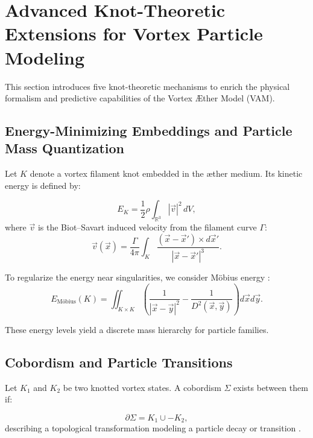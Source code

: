 \section{Advanced Knot-Theoretic Extensions for Vortex Particle Modeling}

This section introduces five knot-theoretic mechanisms to enrich the physical formalism and predictive capabilities of the Vortex Æther Model (VAM).

\subsection{Energy-Minimizing Embeddings and Particle Mass Quantization}

Let $K$ denote a vortex filament knot embedded in the æther medium. Its kinetic energy is defined by:

\begin{equation}
    E_K = \frac{1}{2} \rho \int_{\mathbb{R}^3} |\vec{v}|^2 \, dV,
\end{equation}
where $\vec{v}$ is the Biot–Savart induced velocity from the filament curve $\Gamma$:
\begin{equation}
    \vec{v}(\vec{x}) = \frac{\Gamma}{4\pi} \int_{K} \frac{(\vec{x} - \vec{x}') \times d\vec{x}'}{|\vec{x} - \vec{x}'|^3}.
\end{equation}

To regularize the energy near singularities, we consider Möbius energy \cite{freedman1994moebius}:
\begin{equation}
    E_\text{M\"obius}(K) = \iint_{K \times K} \left( \frac{1}{|\vec{x} - \vec{y}|^2} - \frac{1}{D^2(\vec{x}, \vec{y})} \right) d\vec{x} d\vec{y}.
\end{equation}

These energy levels yield a discrete mass hierarchy for particle families.

\subsection{Cobordism and Particle Transitions}

Let $K_1$ and $K_2$ be two knotted vortex states. A cobordism $\Sigma$ exists between them if:

\begin{equation}
    \partial \Sigma = K_1 \cup -K_2,
\end{equation}
describing a topological transformation modeling a particle decay or transition \cite{carter1998surfaces}.

